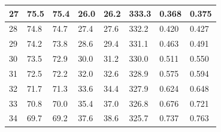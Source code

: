\begin{table}[h!]
\begin{tabular}{|l|l|l|l|l|l|ll}
27                         & 75.5                   & 75.4                     & 26.0                              & 26.2                               & 333.3                      & \multicolumn{1}{l|}{0.368}                    & \multicolumn{1}{l|}{0.375}                      \\ \hline
28                         & 74.8                   & 74.7                     & 27.4                              & 27.6                               & 332.2                      & \multicolumn{1}{l|}{0.420}                    & \multicolumn{1}{l|}{0.427}                      \\ \hline
29                         & 74.2                   & 73.8                     & 28.6                              & 29.4                               & 331.1                      & \multicolumn{1}{l|}{0.463}                    & \multicolumn{1}{l|}{0.491}                      \\ \hline
30                         & 73.5                   & 72.9                     & 30.0                              & 31.2                               & 330.0                      & \multicolumn{1}{l|}{0.511}                    & \multicolumn{1}{l|}{0.550}                      \\ \hline
31                         & 72.5                   & 72.2                     & 32.0                              & 32.6                               & 328.9                      & \multicolumn{1}{l|}{0.575}                    & \multicolumn{1}{l|}{0.594}                      \\ \hline
32                         & 71.7                   & 71.3                     & 33.6                              & 34.4                               & 327.9                      & \multicolumn{1}{l|}{0.624}                    & \multicolumn{1}{l|}{0.648}                      \\ \hline
33                         & 70.8                   & 70.0                     & 35.4                              & 37.0                               & 326.8                      & \multicolumn{1}{l|}{0.676}                    & \multicolumn{1}{l|}{0.721}                      \\ \hline
34                         & 69.7                   & 69.2                     & 37.6                              & 38.6                               & 325.7                      & \multicolumn{1}{l|}{0.737}                    & \multicolumn{1}{l|}{0.763}                      \\ \hline

\end{tabular}
\end{table}

